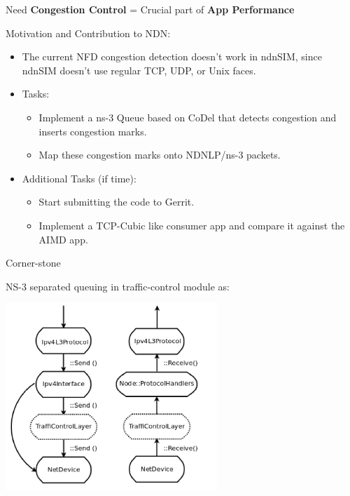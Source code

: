 

\begin{frame}{Need}
\textbf{Congestion Control} = Crucial part of \textbf{App Performance}
\end{frame}


\begin{frame}{Motivation and Contribution to NDN:}
\begin{itemize}
\item The current NFD congestion detection doesn't work in ndnSIM, since ndnSIM doesn't use regular TCP, UDP, or Unix faces. 
\item Tasks: 
\begin{itemize}
\item Implement a ns-3 Queue based on CoDel that detects congestion and inserts congestion marks.
\item Map these congestion marks onto NDNLP/ns-3 packets.
\end{itemize}
\item Additional Tasks (if time):
\begin{itemize}
\item Start submitting the code to Gerrit.
\item Implement a TCP-Cubic like consumer app and compare it against the AIMD app.
\end{itemize}
\end{itemize}
\end{frame}



\begin{frame}{Corner-stone}

NS-3 separated queuing in traffic-control module as:

\includegraphics[height=200pt]{../figs/ns3-queue.png}

\end{frame}



